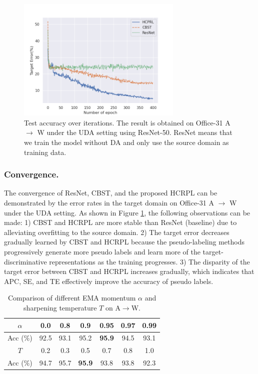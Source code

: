 \documentclass[a4paper,fleqn]{cas-dc}
\begin{document}
	\begin{figure}
		\centering
		\includegraphics[width=3.1in]{figs/target_error.png}
		\caption{Test accuracy over iterations. The result is obtained on Office-31 A $\rightarrow$ W under the UDA setting using ResNet-50. ResNet means that we train the model without DA and only use the source domain as training data. 
		}\label{fig9}
	\end{figure}
	
	\subsubsection{Convergence.} The convergence of ResNet, CBST, and the proposed HCRPL can be demonstrated by the error rates in the target domain on Office-31 A $\rightarrow$ W under the UDA setting. As shown in Figure \ref{fig9}, the following observations can be made: 1) CBST and HCRPL are more stable than ResNet (baseline) due to alleviating overfitting to the source domain. 2) The target error decreases gradually learned by CBST and HCRPL because the pseudo-labeling methods progressively generate more pseudo labels and learn more of the target-discriminative representations as the training progresses. 3) The disparity of the target error between CBST and HCRPL increases gradually, which indicates that APC, SE, and TE effectively improve the accuracy of pseudo labels.
	
	
	\begin{table}[htbp]
		\centering
		\setlength{\belowcaptionskip}{-0.1cm}
		\setlength{\abovecaptionskip}{3pt}
		\caption{Comparison of different EMA momentum $\alpha$ and sharpening temperature $T$ on A$\rightarrow$W.}
		\begin{tabular}{|c|c|c|c|c|c|c|}
			\hline
			$\alpha$ & 0.0 & 0.8 & 0.9 & 0.95 & 0.97 & 0.99 \\
			\hline
			Acc ($\%$) & 92.5 & 93.1 & 95.2 & \textbf{95.9} & 94.5 & 93.1 \\
			\hline
			\hline
			$T$ & 0.2 & 0.3 & 0.5 & 0.7 & 0.8 & 1.0 \\
			\hline
			Acc ($\%$) & 94.7 & 95.7 & \textbf{95.9} & 93.8 & 93.8 & 92.3 \\
			\hline
		\end{tabular}
		\label{tab2}
	\end{table}
	
\end{document}
